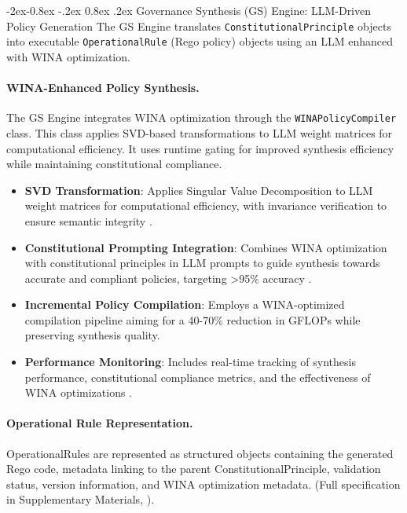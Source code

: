 \documentclass[manuscript,screen,9pt]{acmart}
\makeatletter
\renewcommand\subsubsection{\@startsection{subsubsection}{3}{\z@}%
  {-2ex\@plus -0.8ex \@minus -.2ex}%
  {0.8ex \@plus .2ex}%
  {\normalfont\normalsize\bfseries}}
\makeatother
\begin{document}
\begin{table}[!htb]
\subsubsection{Governance Synthesis (GS) Engine: LLM-Driven Policy Generation}
\label{subsubsec:gs_engine_layer}
The GS Engine translates \texttt{ConstitutionalPrinciple} objects into executable \texttt{OperationalRule} (Rego policy) objects using an LLM enhanced with WINA optimization.

\paragraph{WINA-Enhanced Policy Synthesis.} \sloppy
The GS Engine integrates WINA optimization through the \texttt{WINA\-Policy\-Compiler} class. This class applies SVD-based transformations to LLM weight matrices for computational efficiency. It uses runtime gating for improved synthesis efficiency while maintaining constitutional compliance. \fussy
\begin{itemize}[leftmargin=*,itemsep=1pt,parsep=1pt]
    \item \textbf{SVD Transformation}: Applies Singular Value Decomposition to LLM weight matrices for computational efficiency, with invariance verification to ensure semantic integrity \cite{SVDOptimization2024}.
    \item \textbf{Constitutional Prompting Integration}: Combines WINA optimization with constitutional principles in LLM prompts to guide synthesis towards accurate and compliant policies, targeting >95\% accuracy \cite{ConstitutionalCompliance2024}.
    \item \textbf{Incremental Policy Compilation}: Employs a WINA-optimized compilation pipeline aiming for a 40-70\% reduction in GFLOPs while preserving synthesis quality.
    \item \textbf{Performance Monitoring}: Includes real-time tracking of synthesis performance, constitutional compliance metrics, and the effectiveness of WINA optimizations \cite{PerformanceMonitoring2024}.
\end{itemize}

\paragraph{Operational Rule Representation.} OperationalRules are represented as structured objects containing the generated Rego code, metadata linking to the parent ConstitutionalPrinciple, validation status, version information, and WINA optimization metadata. (Full specification in Supplementary Materials, ).


\end{table}
\end{document}
